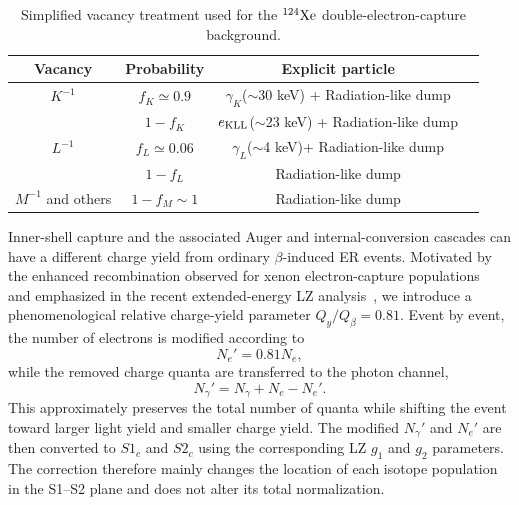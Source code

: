 \documentclass[11pt,a4paper]{article}
\begin{document}
\begin{table}[t]
\centering
\begin{tabular}{cccc}
\hline
Vacancy  & Probability & Explicit particle \\
\hline
$K^{-1}$ &  $f_K\simeq0.9$ & $\gamma_K$($\sim$30 keV) + Radiation-like dump\\
          & $1-f_K$ & $e_{\rm KLL}$($\sim$23 keV) + Radiation-like dump \\
$L^{-1}$  & $f_L\simeq 0.06$ & $\gamma_L$($\sim$4 keV)+ Radiation-like dump \\
          & $1-f_L$ &  Radiation-like dump \\
$M^{-1}$ and others  & $1-f_M \sim 1$ &  Radiation-like dump \\
\hline
\end{tabular}
\caption{Simplified vacancy treatment used for the $^{124}{\rm Xe}$ double-electron-capture background.}
\label{tab:xe124_vacancy}
\end{table}


Inner-shell capture and the associated Auger and internal-conversion cascades can have a different charge yield from ordinary $\beta$-induced ER events. Motivated by the enhanced recombination observed for xenon electron-capture populations~\cite{LZ:2025hud} and emphasized in the recent extended-energy LZ analysis~\cite{LZ2026}, we introduce a phenomenological relative charge-yield parameter $Q_y/Q_\beta=0.81$. Event by event, the number of electrons is modified according to
\begin{equation}
N_e'=0.81N_e,
\end{equation}
while the removed charge quanta are transferred to the photon channel,
\begin{equation}
N_\gamma'=N_\gamma+N_e-N_e'.
\end{equation}
This approximately preserves the total number of quanta while shifting the event toward larger light yield and smaller charge yield. The modified $N_\gamma'$ and $N_e'$ are then converted to $S1_c$ and $S2_c$ using the corresponding LZ $g_1$ and $g_2$ parameters. The correction therefore mainly changes the location of each isotope population in the S1--S2 plane and does not alter its total normalization.



\end{document}
